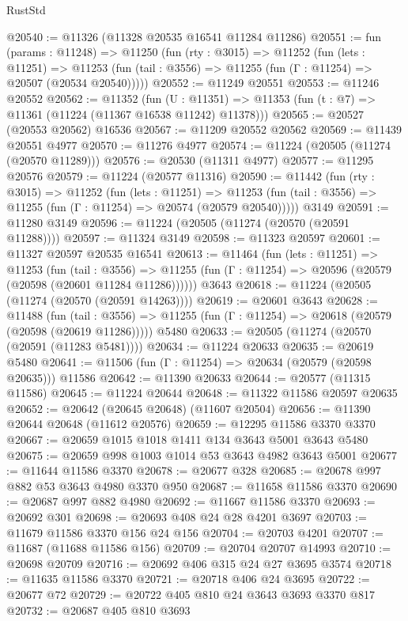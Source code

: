 \begin{lexlean}{RustStd}
\begin{coremodule}
@20540 := @11326 (@11328 @20535 @16541 @11284 @11286)
@20551 := fun (params : @11248) =>
  @11250
    (fun (rty : @3015) =>
    @11252
      (fun (lets : @11251) =>
      @11253 (fun (tail : @3556) => @11255 (fun (Γ : @11254) => @20507 (@20534 @20540)))))
@20552 := @11249 @20551
@20553 := @11246 @20552
@20562 := @11352
    (fun (U : @11351) => @11353 (fun (t : @7) => @11361 (@11224 (@11367 @16538 @11242) @11378)))
@20565 := @20527 (@20553 @20562) @16536
@20567 := @11209 @20552 @20562
@20569 := @11439 @20551 @4977
@20570 := @11276 @4977
@20574 := @11224 (@20505 (@11274 (@20570 @11289)))
@20576 := @20530 (@11311 @4977)
@20577 := @11295 @20576
@20579 := @11224 (@20577 @11316)
@20590 := @11442
    (fun (rty : @3015) =>
    @11252
      (fun (lets : @11251) =>
      @11253 (fun (tail : @3556) => @11255 (fun (Γ : @11254) => @20574 (@20579 @20540)))))
    @3149
@20591 := @11280 @3149
@20596 := @11224 (@20505 (@11274 (@20570 (@20591 @11288))))
@20597 := @11324 @3149
@20598 := @11323 @20597
@20601 := @11327 @20597 @20535 @16541
@20613 := @11464
    (fun (lets : @11251) =>
    @11253
      (fun (tail : @3556) =>
      @11255 (fun (Γ : @11254) => @20596 (@20579 (@20598 (@20601 @11284 @11286))))))
    @3643
@20618 := @11224 (@20505 (@11274 (@20570 (@20591 @14263))))
@20619 := @20601 @3643
@20628 := @11488
    (fun (tail : @3556) => @11255 (fun (Γ : @11254) => @20618 (@20579 (@20598 (@20619 @11286)))))
    @5480
@20633 := @20505 (@11274 (@20570 (@20591 (@11283 @5481))))
@20634 := @11224 @20633
@20635 := @20619 @5480
@20641 := @11506 (fun (Γ : @11254) => @20634 (@20579 (@20598 @20635))) @11586
@20642 := @11390 @20633
@20644 := @20577 (@11315 @11586)
@20645 := @11224 @20644
@20648 := @11322 @11586 @20597 @20635
@20652 := @20642 (@20645 @20648) (@11607 @20504)
@20656 := @11390 @20644 @20648 (@11612 @20576)
@20659 := @12295 @11586 @3370 @3370
@20667 := @20659 @1015 @1018 @1411 @134 @3643 @5001 @3643 @5480
@20675 := @20659 @998 @1003 @1014 @53 @3643 @4982 @3643 @5001
@20677 := @11644 @11586 @3370
@20678 := @20677 @328
@20685 := @20678 @997 @882 @53 @3643 @4980 @3370 @950
@20687 := @11658 @11586 @3370
@20690 := @20687 @997 @882 @4980
@20692 := @11667 @11586 @3370
@20693 := @20692 @301
@20698 := @20693 @408 @24 @28 @4201 @3697
@20703 := @11679 @11586 @3370 @156 @24 @156
@20704 := @20703 @4201
@20707 := @11687 (@11688 @11586 @156)
@20709 := @20704 @20707 @14993
@20710 := @20698 @20709
@20716 := @20692 @406 @315 @24 @27 @3695 @3574
@20718 := @11635 @11586 @3370
@20721 := @20718 @406 @24 @3695
@20722 := @20677 @72
@20729 := @20722 @405 @810 @24 @3643 @3693 @3370 @817
@20732 := @20687 @405 @810 @3693

\end{coremodule}
\end{lexlean}
